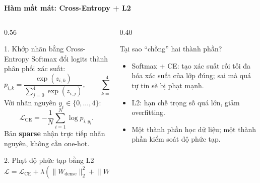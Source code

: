 \documentclass[aspectratio=169]{beamer}
\begin{document}
\begin{frame}{\textbf{\large Hàm mất mát: Cross-Entropy + L2}}
    \begin{columns}[T,onlytextwidth]
        \begin{column}{0.56\textwidth}
            \begin{block}{1. Khớp nhãn bằng Cross-Entropy}
                Softmax đổi logits thành phân phối xác suất:
                \[
                    p_{i,k}=\frac{\exp(z_{i,k})}
                    {\sum_{j=0}^{4}\exp(z_{i,j})},
                    \qquad \sum_{k=0}^{4}p_{i,k}=1.
                \]
                Với nhãn nguyên $y_i\in\{0,\ldots,4\}$:
                \[
                    \mathcal L_{\mathrm{CE}}
                    =-\frac{1}{N}\sum_{i=1}^{N}\log p_{i,y_i}.
                \]
                Bản \textbf{sparse} nhận trực tiếp nhãn nguyên, không cần one-hot.
            \end{block}

            \begin{block}{2. Phạt độ phức tạp bằng L2}
                \[
                    \mathcal L
                    =\mathcal L_{\mathrm{CE}}
                    +\lambda\!\left(
                    \lVert W_{\mathrm{dense}}\rVert_2^2+
                    \lVert W_{\mathrm{out}}\rVert_2^2\right),
                    \quad\lambda=0{,}01.
                \]
            \end{block}
        \end{column}

        \begin{column}{0.40\textwidth}
            \begin{exampleblock}{Tại sao ``chồng'' hai thành phần?}
                \begin{itemize}
                    \item Softmax + CE: tạo xác suất rồi tối đa hóa xác suất của
                    lớp đúng; sai mà quá tự tin sẽ bị phạt mạnh.
                    \item L2: hạn chế trọng số quá lớn, giảm overfitting.
                    \item Một thành phần học dữ liệu; một thành phần kiểm soát
                    độ phức tạp.
                \end{itemize}
            \end{exampleblock}


\end{column}
\end{columns}
\end{frame}
\end{document}
